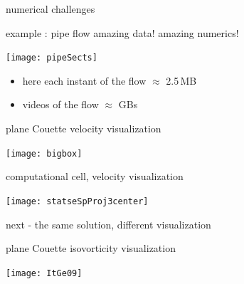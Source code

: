 \begin{frame}{numerical challenges}
\end{frame}

\begin{frame}{example : pipe flow}
amazing data! amazing numerics!
\begin{center}
  \texttt{[image: pipeSects]}
\end{center}

\begin{itemize}
 \item here each instant of the flow $\approx$ 2.5\,MB
 \item videos of the flow $\approx$ GBs
\end{itemize}
\end{frame}

\begin{frame}{plane Couette velocity visualization}
\begin{center}
\texttt{[image: bigbox]}
\end{center}
\end{frame}

\begin{frame}{computational cell, velocity visualization}
\begin{center}
\texttt{[image: statseSpProj3center]}
\end{center}
next - the same solution, different visualization
\end{frame}

\begin{frame}{plane Couette isovorticity visualization}
\begin{center}
\texttt{[image: ItGe09]}
\end{center}
\end{frame}


